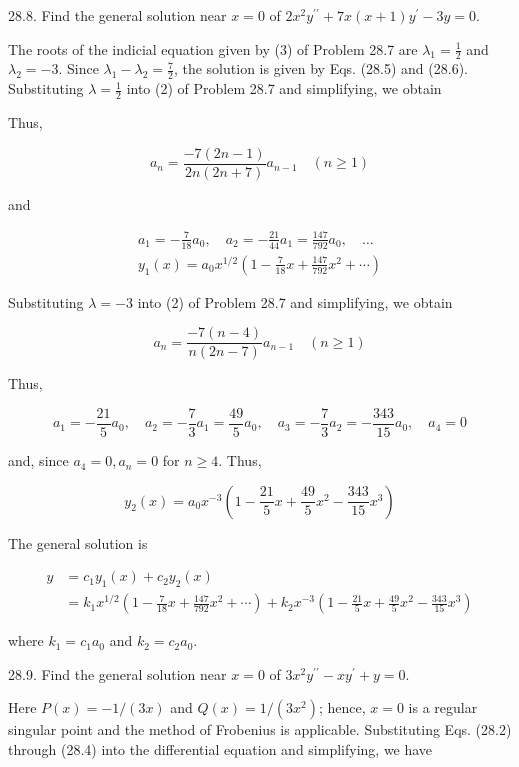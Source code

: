 \documentclass[10pt]{article}
\begin{document}
28.8. Find the general solution near $x=0$ of $2 x^{2} y^{\prime \prime}+7 x(x+1) y^{\prime}-3 y=0$.

The roots of the indicial equation given by (3) of Problem 28.7 are $\lambda_{1}=\frac{1}{2}$ and $\lambda_{2}=-3$. Since $\lambda_{1}-\lambda_{2}=\frac{7}{2}$, the solution is given by Eqs. (28.5) and (28.6). Substituting $\lambda=\frac{1}{2}$ into (2) of Problem 28.7 and simplifying, we obtain

Thus,

$$
a_{n}=\frac{-7(2 n-1)}{2 n(2 n+7)} a_{n-1} \quad(n \geq 1)
$$

and

$$
\begin{gathered}
a_{1}=-\frac{7}{18} a_{0}, \quad a_{2}=-\frac{21}{44} a_{1}=\frac{147}{792} a_{0}, \quad \ldots \\
y_{1}(x)=a_{0} x^{1 / 2}\left(1-\frac{7}{18} x+\frac{147}{792} x^{2}+\cdots\right)
\end{gathered}
$$

Substituting $\lambda=-3$ into (2) of Problem 28.7 and simplifying, we obtain

$$
a_{n}=\frac{-7(n-4)}{n(2 n-7)} a_{n-1} \quad(n \geq 1)
$$

Thus,

$$
a_{1}=-\frac{21}{5} a_{0}, \quad a_{2}=-\frac{7}{3} a_{1}=\frac{49}{5} a_{0}, \quad a_{3}=-\frac{7}{3} a_{2}=-\frac{343}{15} a_{0}, \quad a_{4}=0
$$

and, since $a_{4}=0, a_{n}=0$ for $n \geq 4$. Thus,

$$
y_{2}(x)=a_{0} x^{-3}\left(1-\frac{21}{5} x+\frac{49}{5} x^{2}-\frac{343}{15} x^{3}\right)
$$

The general solution is

$$
\begin{aligned}
y & =c_{1} y_{1}(x)+c_{2} y_{2}(x) \\
& =k_{1} x^{1 / 2}\left(1-\frac{7}{18} x+\frac{147}{792} x^{2}+\cdots\right)+k_{2} x^{-3}\left(1-\frac{21}{5} x+\frac{49}{5} x^{2}-\frac{343}{15} x^{3}\right)
\end{aligned}
$$

where $k_{1}=c_{1} a_{0}$ and $k_{2}=c_{2} a_{0}$.

28.9. Find the general solution near $x=0$ of $3 x^{2} y^{\prime \prime}-x y^{\prime}+y=0$.

Here $P(x)=-1 /(3 x)$ and $Q(x)=1 /\left(3 x^{2}\right)$; hence, $x=0$ is a regular singular point and the method of Frobenius is applicable. Substituting Eqs. (28.2) through (28.4) into the differential equation and simplifying, we have
\end{document}
